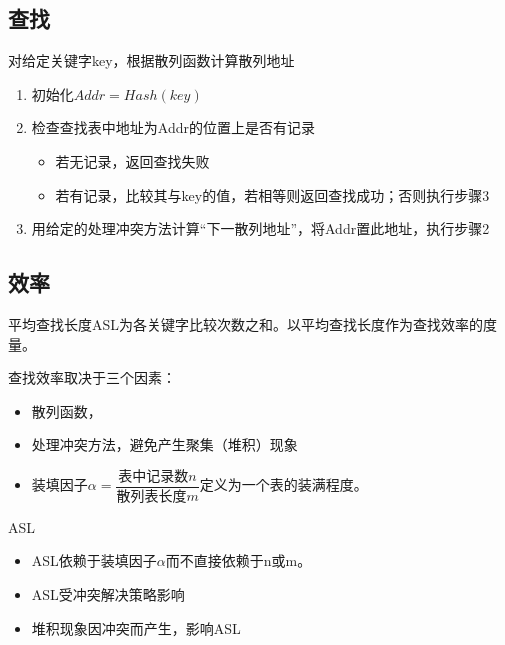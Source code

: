\subsection{查找}
对给定关键字key，根据散列函数计算散列地址
\begin{enumerate}
    \item 初始化\(Addr = Hash(key)\)
    \item 检查查找表中地址为Addr的位置上是否有记录\begin{itemize}
        \item 若无记录，返回查找失败
        \item 若有记录，比较其与key的值，若相等则返回查找成功；否则执行步骤3
    \end{itemize}
    \item 用给定的处理冲突方法计算“下一散列地址”，将Addr置此地址，执行步骤2
\end{enumerate}


\subsection{效率}
平均查找长度ASL为各关键字比较次数之和。以平均查找长度作为查找效率的度量。

查找效率取决于三个因素：\begin{itemize}
    \item 散列函数，
    \item 处理冲突方法，避免产生聚集（堆积）现象
    \item 装填因子\(\alpha = \dfrac{\text{表中记录数}n}{\text{散列表长度}m}\)定义为一个表的装满程度。
\end{itemize}

ASL
\begin{itemize}
    \item ASL依赖于装填因子\(\alpha\)而不直接依赖于n或m。
    \item ASL受冲突解决策略影响
    \item 堆积现象因冲突而产生，影响ASL
\end{itemize}







